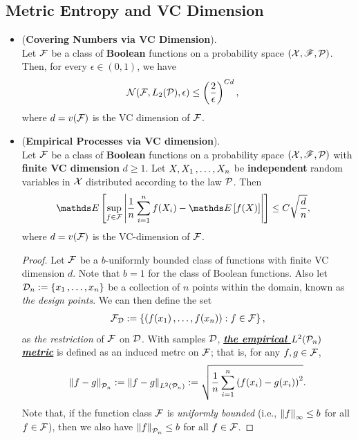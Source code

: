 \documentclass[11pt]{article}
\begin{document}
\subsection{Metric Entropy and VC Dimension}
\begin{itemize}
\item \begin{theorem} (\textbf{Covering Numbers via VC Dimension}).  \citep{vershynin2018high}\\
Let ${\mathcal F}$ be a class of \textbf{Boolean} functions  on a probability space $({\mathcal X}, {\mathscr F}, {\mathcal P})$. Then, for every $\epsilon \in (0, 1)$, we
have
\begin{align}
{\mathcal N}({\mathcal F}, L_2({\mathcal P}), \epsilon) &\le \left(\frac{2}{\epsilon}\right)^{Cd}, \label{ineqn: covering_number_bound_vc_dimension}
\end{align} where $d =v({\mathcal F})$ is the VC dimension of ${\mathcal F}$.
\end{theorem}

\item  \begin{theorem} (\textbf{Empirical Processes via VC dimension}).  \citep{vershynin2018high}\\
Let ${\mathcal F}$ be a class of \textbf{Boolean} functions  on a probability space $({\mathcal X}, {\mathscr F}, {\mathcal P})$ with \textbf{finite VC dimension} $d \ge 1$. Let $X, X_1 \,{,}\ldots{,}\, X_n$ be \textbf{independent} random variables in ${\mathcal X}$ distributed according to the law ${\mathcal P}$. Then 
\begin{align}
\E{}{\sup_{f \in \cF}\abs{\frac{1}{n}\sum_{i=1}^{n}f(X_i) - \E{}{f(X)}}} &\le C\sqrt{\frac{d}{n}}, \label{ineqn: expected_emp_process_vc_dimension}
\end{align} where $d = v({\mathcal F})$ is the VC-dimension of ${\mathcal F}$.
\end{theorem}
\begin{proof}
Let ${\mathcal F}$ be a $b$-uniformly bounded class of functions with finite VC dimension $d$. Note that $b = 1$ for the class of Boolean functions.  Also let ${\mathcal D}_n := \left\{x_1 \,{,}\ldots{,}\, x_n\right\}$ be a collection of $n$ points within the domain, known as \emph{the design points}. We can then define the set
\begin{align*}
{\mathcal F}_{{\mathcal D}} := \left\{(f(x_1) \,{,}\ldots{,}\, f(x_n)): f \in {\mathcal F}\right\},
\end{align*} as \emph{the restriction} of ${\mathcal F}$ on ${\mathcal D}$. With samples ${\mathcal D}$, \underline{\emph{\textbf{the empirical $L^2({\mathcal P}_n)$ metric}}}  is defined as an induced metrc on ${\mathcal F}$; that is, for any $f, g \in {\mathcal F}$,
\begin{align}
\left\|f - g\right\|_{{\mathcal P}_n} := \left\|f - g\right\|_{L^2({\mathcal P}_n)} := \sqrt{\frac{1}{n}\sum_{i=1}^n\left(f(x_i) - g(x_i)\right)^2}.
\label{def: emp_distance}
\end{align} Note that, if the function class ${\mathcal F}$ is \emph{uniformly bounded} (i.e.,  $\left\|f\right\|_{\infty} \le b$ for all $f \in {\mathcal F}$), then we also have $\left\|f\right\|_{{\mathcal P}_n} \le b$ for all $f \in {\mathcal F}$. 


\end{proof}
\end{itemize}
\end{document}
